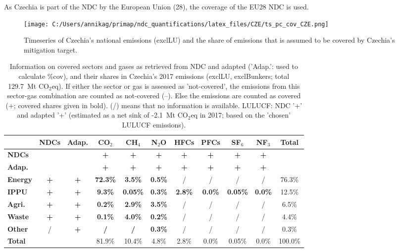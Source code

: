 \documentclass[12pt]{article}
\begin{document}
 As Czechia is part of the NDC by the European Union (28), the coverage of the EU28 NDC is used.

 \begin{figure}[H]
 \centering
 \texttt{[image: C:/Users/annikag/primap/ndc\_quantifications/latex\_files/CZE/ts\_pc\_cov\_CZE.png]}
 \caption{Timeseries of Czechia's national emissions (exclLU) and the share of emissions that is assumed to be covered by Czechia's mitigation target.}
 \label{fig:tsPcCov}
 \end{figure}

 \begin{table}[H]\small
 \centering
 \caption{Information on covered sectors and gases as retrieved from NDC and adapted ('Adap.': used to calculate \%cov), and their shares in Czechia's 2017 emissions (exclLU, exclBunkers; total 129.7~Mt CO$_2$eq).
 If either the sector or gas is assessed as 'not-covered', the emissions from this sector-gas combination are counted as not-covered (--). 
 Else the emissions are counted as covered (+; covered shares given in bold).
 (/) means that no information is available.
 LULUCF: NDC '+' and adapted '+' (estimated as a net sink of -2.1~Mt CO$_2$eq in 2017; based on the 'chosen' LULUCF emissions).}
 \label{tab:coveredSectorsGases}
 \begin{tabular}{l || c c || c c c c c c c | c}
 \bfseries  & \bfseries NDCs & \bfseries Adap. & \bfseries CO$_2$ & \bfseries CH$_4$ & \bfseries N$_2$O & \bfseries HFCs & \bfseries PFCs & \bfseries SF$_6$ & \bfseries NF$_3$ & \bfseries Total \tabularnewline \hline \hline
 \bfseries NDCs &  &  & \bfseries + & \bfseries + & \bfseries + & \bfseries + & \bfseries + & \bfseries + & \bfseries + &  \tabularnewline 
 \bfseries Adap. &  &  & \bfseries + & \bfseries + & \bfseries + & \bfseries + & \bfseries + & \bfseries + & \bfseries + &  \tabularnewline \hline \hline
 \bfseries Energy & \bfseries + & \bfseries + & \bfseries 72.3\% & \bfseries 3.5\% & \bfseries 0.5\% & / & / & / & / & 76.3\% \tabularnewline 
 \bfseries IPPU & \bfseries + & \bfseries + & \bfseries 9.3\% & \bfseries 0.05\% & \bfseries 0.3\% & \bfseries 2.8\% & \bfseries 0.0\% & \bfseries 0.05\% & \bfseries 0.0\% & 12.5\% \tabularnewline 
 \bfseries Agri. & \bfseries + & \bfseries + & \bfseries 0.2\% & \bfseries 2.9\% & \bfseries 3.5\% & / & / & / & / & 6.5\% \tabularnewline 
 \bfseries Waste & \bfseries + & \bfseries + & \bfseries 0.1\% & \bfseries 4.0\% & \bfseries 0.2\% & / & / & / & / & 4.4\% \tabularnewline 
 \bfseries Other & / & \bfseries + & \bfseries / & \bfseries / & \bfseries 0.3\% & / & / & / & / & 0.3\% \tabularnewline \hline
 \bfseries Total &  &  & 81.9\% & 10.4\% & 4.8\% & 2.8\% & 0.0\% & 0.05\% & 0.0\% & 100.0\% \tabularnewline 
 \end{tabular}
 \end{table}
\end{document}
